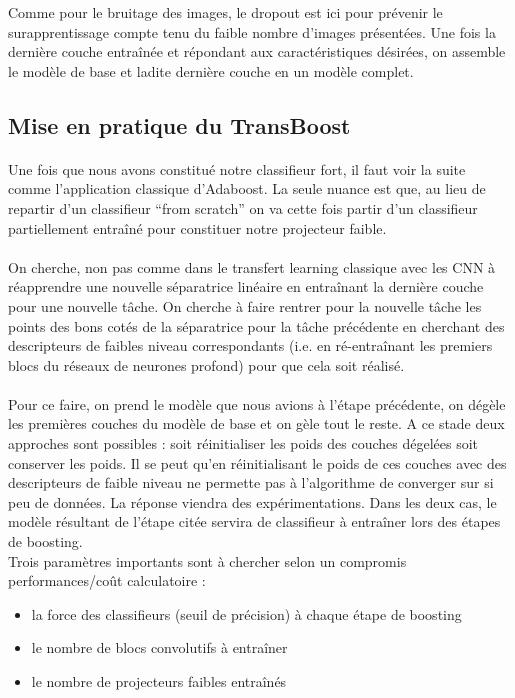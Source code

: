 \documentclass[11 pt]{article}
\begin{document}
Comme pour le bruitage des images, le dropout est ici pour prévenir le surapprentissage compte tenu du faible nombre d’images présentées.
Une fois la dernière couche entraînée et répondant aux caractéristiques désirées, on assemble le modèle de base et ladite dernière couche en un modèle complet.


\subsection{Mise en pratique du TransBoost}
\paragraph{}Une fois que nous avons constitué notre classifieur fort, il faut voir la suite comme l’application classique d’Adaboost. La seule nuance est que, au lieu de repartir d’un classifieur “from scratch” on va cette fois partir d’un classifieur partiellement entraîné pour constituer notre projecteur faible.

\paragraph{}On cherche, non pas comme dans le transfert learning classique avec les CNN à réapprendre une nouvelle séparatrice linéaire en entraînant la dernière couche pour une nouvelle tâche. On cherche à faire rentrer pour la nouvelle tâche les points des bons cotés de la séparatrice pour la tâche précédente en cherchant des descripteurs de faibles niveau correspondants (i.e. en ré-entraînant les premiers blocs du réseaux de neurones profond) pour que cela soit réalisé.

\paragraph{}Pour ce faire,  on prend le modèle que nous avions à l’étape précédente, on dégèle les premières couches du modèle de base et on gèle tout le reste. A ce stade deux approches sont possibles : soit réinitialiser les poids des couches dégelées soit conserver les poids. Il se peut qu’en réinitialisant le poids de ces couches avec des descripteurs de faible niveau ne permette pas à l’algorithme de converger sur si peu de données. La réponse viendra des expérimentations. Dans les deux cas, le modèle résultant de l’étape citée servira de classifieur à entraîner lors des étapes de boosting.\\

Trois paramètres importants sont à chercher selon un compromis performances/coût calculatoire :\\ \medskip
\begin{itemize}
  \item la force des classifieurs (seuil de précision) à chaque étape de boosting
  \item le nombre de blocs convolutifs à entraîner
  \item le nombre de projecteurs faibles entraînés
\end{itemize}
\end{document}
